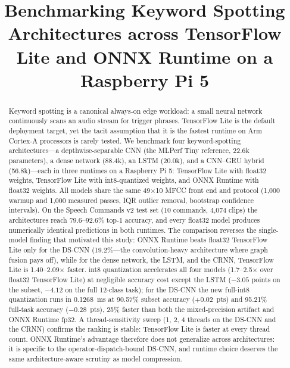 \documentclass[conference,a4paper]{IEEEtran}
\begin{document}
\title{Benchmarking Keyword Spotting Architectures across TensorFlow Lite and ONNX Runtime on a Raspberry Pi 5}

\author{
\and
{}
}

\maketitle

\begin{abstract}
Keyword spotting is a canonical always-on edge workload: a small neural network continuously scans an audio stream for trigger phrases. TensorFlow Lite is the default deployment target, yet the tacit assumption that it is the fastest runtime on Arm Cortex-A processors is rarely tested. We benchmark four keyword-spotting architectures---a depthwise-separable CNN (the MLPerf Tiny reference, 22.6k parameters), a dense network (88.4k), an LSTM (20.0k), and a CNN--GRU hybrid (56.8k)---each in three runtimes on a Raspberry Pi 5: TensorFlow Lite with float32 weights, TensorFlow Lite with int8-quantized weights, and ONNX Runtime with float32 weights. All models share the same 49$\times$10 MFCC front end and protocol (1{,}000 warmup and 1{,}000 measured passes, IQR outlier removal, bootstrap confidence intervals). On the Speech Commands v2 test set (10 commands, 4{,}074 clips) the architectures reach 79.6--92.6\% top-1 accuracy, and every float32 model produces numerically identical predictions in both runtimes. The comparison reverses the single-model finding that motivated this study: ONNX Runtime beats float32 TensorFlow Lite only for the DS-CNN (19.2\%---the convolution-heavy architecture where graph fusion pays off), while for the dense network, the LSTM, and the CRNN, TensorFlow Lite is 1.40--2.09$\times$ faster. int8 quantization accelerates all four models (1.7--2.5$\times$ over float32 TensorFlow Lite) at negligible accuracy cost except the LSTM ($-3.05$ points on the subset, $-4.12$ on the full 12-class task); for the DS-CNN the new full-int8 quantization runs in 0.1268~ms at 90.57\% subset accuracy ($+0.02$~pts) and 95.21\% full-task accuracy ($-0.28$~pts), 25\% faster than both the mixed-precision artifact and ONNX Runtime fp32. A thread-sensitivity sweep (1, 2, 4 threads on the DS-CNN and the CRNN) confirms the ranking is stable: TensorFlow Lite is faster at every thread count. ONNX Runtime's advantage therefore does not generalize across architectures: it is specific to the operator-dispatch-bound DS-CNN, and runtime choice deserves the same architecture-aware scrutiny as model compression.
\end{abstract}
\end{document}
